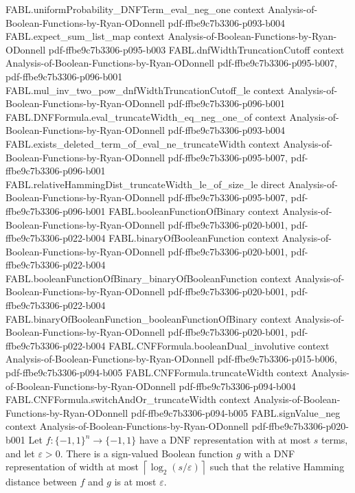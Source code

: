 \begin{theorem}
\proofstep
  {FABL.uniformProbability_DNFTerm_eval_neg_one}
  {context}
  {Analysis-of-Boolean-Functions-by-Ryan-ODonnell}
  {pdf-ffbe9c7b3306-p093-b004}
\proofstep
  {FABL.expect_sum_list_map}
  {context}
  {Analysis-of-Boolean-Functions-by-Ryan-ODonnell}
  {pdf-ffbe9c7b3306-p095-b003}
\proofstep
  {FABL.dnfWidthTruncationCutoff}
  {context}
  {Analysis-of-Boolean-Functions-by-Ryan-ODonnell}
  {pdf-ffbe9c7b3306-p095-b007,
    pdf-ffbe9c7b3306-p096-b001}
\proofstep
  {FABL.mul_inv_two_pow_dnfWidthTruncationCutoff_le}
  {context}
  {Analysis-of-Boolean-Functions-by-Ryan-ODonnell}
  {pdf-ffbe9c7b3306-p096-b001}
\proofstep
  {FABL.DNFFormula.eval_truncateWidth_eq_neg_one_of}
  {context}
  {Analysis-of-Boolean-Functions-by-Ryan-ODonnell}
  {pdf-ffbe9c7b3306-p093-b004}
\proofstep
  {FABL.exists_deleted_term_of_eval_ne_truncateWidth}
  {context}
  {Analysis-of-Boolean-Functions-by-Ryan-ODonnell}
  {pdf-ffbe9c7b3306-p095-b007,
    pdf-ffbe9c7b3306-p096-b001}
\proofstep
  {FABL.relativeHammingDist_truncateWidth_le_of_size_le}
  {direct}
  {Analysis-of-Boolean-Functions-by-Ryan-ODonnell}
  {pdf-ffbe9c7b3306-p095-b007,
    pdf-ffbe9c7b3306-p096-b001}
\proofstep
  {FABL.booleanFunctionOfBinary}
  {context}
  {Analysis-of-Boolean-Functions-by-Ryan-ODonnell}
  {pdf-ffbe9c7b3306-p020-b001,
    pdf-ffbe9c7b3306-p022-b004}
\proofstep
  {FABL.binaryOfBooleanFunction}
  {context}
  {Analysis-of-Boolean-Functions-by-Ryan-ODonnell}
  {pdf-ffbe9c7b3306-p020-b001,
    pdf-ffbe9c7b3306-p022-b004}
\proofstep
  {FABL.booleanFunctionOfBinary_binaryOfBooleanFunction}
  {context}
  {Analysis-of-Boolean-Functions-by-Ryan-ODonnell}
  {pdf-ffbe9c7b3306-p020-b001,
    pdf-ffbe9c7b3306-p022-b004}
\proofstep
  {FABL.binaryOfBooleanFunction_booleanFunctionOfBinary}
  {context}
  {Analysis-of-Boolean-Functions-by-Ryan-ODonnell}
  {pdf-ffbe9c7b3306-p020-b001,
    pdf-ffbe9c7b3306-p022-b004}
\proofstep
  {FABL.CNFFormula.booleanDual_involutive}
  {context}
  {Analysis-of-Boolean-Functions-by-Ryan-ODonnell}
  {pdf-ffbe9c7b3306-p015-b006,
    pdf-ffbe9c7b3306-p094-b005}
\proofstep
  {FABL.CNFFormula.truncateWidth}
  {context}
  {Analysis-of-Boolean-Functions-by-Ryan-ODonnell}
  {pdf-ffbe9c7b3306-p094-b004}
\proofstep
  {FABL.CNFFormula.switchAndOr_truncateWidth}
  {context}
  {Analysis-of-Boolean-Functions-by-Ryan-ODonnell}
  {pdf-ffbe9c7b3306-p094-b005}
\proofstep
  {FABL.signValue_neg}
  {context}
  {Analysis-of-Boolean-Functions-by-Ryan-ODonnell}
  {pdf-ffbe9c7b3306-p020-b001}
Let $f:\{−1,1\}^n\to\{−1,1\}$ have a DNF representation with at most $s$ terms, and let
$\varepsilon>0$. There is a sign-valued Boolean function $g$ with a DNF representation
of width at most $\left\lceil\log_2(s/\varepsilon)\right\rceil$ such that the relative
Hamming distance between $f$ and $g$ is at most $\varepsilon$.
\end{theorem}

